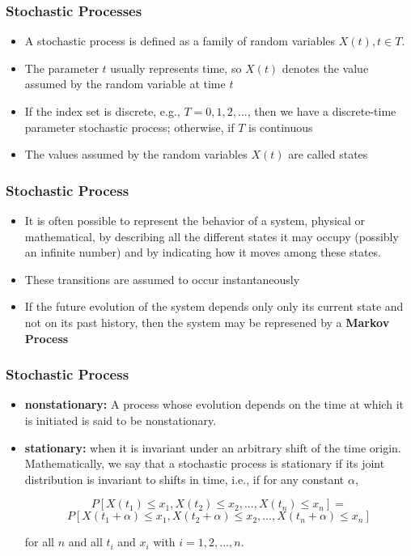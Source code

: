 




\begin{frame}
    \frametitle{Stochastic Processes}
    \begin{itemize}
        \item A stochastic process is defined as a family of random variables ${X(t),t\in T}$.
        \item The parameter $t$ usually represents time, so $X(t)$ denotes the value assumed by the random variable at time $t$
        \item If the index set is discrete, e.g., $T = {0, 1, 2, . . .}$, then we have a discrete-time parameter stochastic 
        process; otherwise, if $T$ is continuous
        \item The values assumed by the random variables $X(t)$ are called states
    \end{itemize}
\end{frame}


\begin{frame}
    \frametitle{Stochastic Process}
    \begin{itemize}
        \item It is often possible to represent the behavior of a system, physical 
        or mathematical, by describing all the different states it may occupy (possibly 
        an infinite number) and by indicating how it moves among these states.
        \item These transitions are assumed to occur instantaneously
        \item If the future evolution of the system depends only only
        its current state and not on its past history, then the system may be represened
        by a \textbf{Markov Process}
    \end{itemize}
\end{frame}


\begin{frame}
    \frametitle{Stochastic Process}
    \begin{itemize}
        \item \textbf{nonstationary:} A process whose evolution depends on the time at which 
        it is initiated is said to be nonstationary.

        \item \textbf{stationary:} when it is invariant under an arbitrary shift of the time origin. 
        Mathematically, we say that a stochastic process is stationary if its joint distribution 
        is invariant to shifts in time, i.e., if for any constant $\alpha$,

        $$P[X(t_1)\leq x_1, X(t_2)\leq x_2, ..., X(t_n)\leq x_n] = $$
        $$P[X(t_1+\alpha)\leq x_1, X(t_2+\alpha)\leq x_2, ..., X(t_n+\alpha)\leq x_n]$$
    
        for all $n$ and all $t_i$ and $x_i$ with $i = 1, 2, . . . , n$.
    \end{itemize}
\end{frame}



